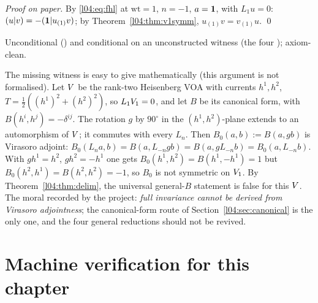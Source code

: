 \emph{Proof on paper.} By \eqref{l04:eq:fhl} at $\mathrm{wt} = 1$, $n = -1$, $a = \mathbf{1}$, with $L_1u = 0$:
$(u|v) = -(\mathbf{1}|u_{(1)}v)$; by Theorem~\ref{l04:thm:v1symm}, $u_{(1)}v = v_{(1)}u$. \qed
\begin{status}
Unconditional (\allowbreak{}\allowbreak{}\allowbreak{}) and conditional on an unconstructed witness (the four
); axiom-clean.
\end{status}

\begin{warning}[title={Trap / dead end: A witness exists on paper; do not re-attempt the general route}]\label{l04:warn:deadend}
The missing witness is easy to give mathematically (this argument is not formalised). Let $V$ be the
rank-two Heisenberg VOA with currents $h^1,h^2$, $T = \frac12((h^1)^2+(h^2)^2)$, so $L_1V_1 = 0$, and let $B$ be
its canonical form, with $B(h^i,h^j) = -\delta^{ij}$. The rotation $g$ by $90^\circ$ in the $(h^1,h^2)$-plane extends
to an automorphism of $V$; it commutes with every $L_n$. Then $B_0(a,b) := B(a,gb)$ is Virasoro adjoint:
$B_0(L_na,b) = B(a,L_{-n}gb) = B(a,gL_{-n}b) = B_0(a,L_{-n}b)$. With $gh^1 = h^2$, $gh^2 = -h^1$ one gets
$B_0(h^1,h^2) = B(h^1,-h^1) = 1$ but $B_0(h^2,h^1) = B(h^2,h^2) = -1$, so $B_0$ is not symmetric on $V_1$. By
Theorem~\ref{l04:thm:delim}, the universal general-$B$ statement is false for this $V$. The moral recorded by
the project: \emph{full invariance cannot be derived from Virasoro adjointness}; the canonical-form route of
Section~\ref{l04:sec:canonical} is the only one, and the four general reductions should not be revived.
\end{warning}

\section{Machine verification for this chapter}\label{l04:sec:audit}

